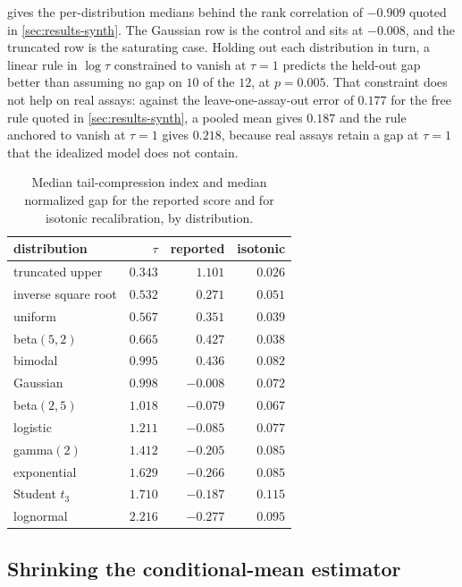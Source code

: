 \documentclass{article}
\theoremstyle{plain}
\theoremstyle{definition}
\begin{document}
 gives the per-distribution medians behind the rank correlation of
$-0.909$ quoted in \cref{sec:results-synth}. The Gaussian row is the control and sits
at $-0.008$, and the truncated row is the saturating case. Holding out each distribution
in turn, a linear rule in $\log \tau$ constrained to vanish at $\tau = 1$ predicts the
held-out gap better than assuming no gap on $10$ of the $12$, at $p = 0.005$. That
constraint does not help on real assays: against the leave-one-assay-out error of
$0.177$ for the free rule quoted in \cref{sec:results-synth}, a pooled mean gives
$0.187$ and the rule anchored to vanish at $\tau = 1$ gives $0.218$, because real
assays retain a gap at $\tau = 1$ that the idealized model does not contain.

\begin{table}[ht]
\caption{Median tail-compression index and median normalized gap for the reported
score and for isotonic recalibration, by distribution.}
\label{tab:shapes}
\vskip 0.1in
\begin{center}
\begin{small}
\begin{tabular}{lrrr}
\toprule
distribution & $\tau$ & reported & isotonic \\
\midrule
truncated upper & $0.343$ & $1.101$ & $0.026$ \\
inverse square root & $0.532$ & $0.271$ & $0.051$ \\
uniform & $0.567$ & $0.351$ & $0.039$ \\
beta$(5,2)$ & $0.665$ & $0.427$ & $0.038$ \\
bimodal & $0.995$ & $0.436$ & $0.082$ \\
Gaussian & $0.998$ & $-0.008$ & $0.072$ \\
beta$(2,5)$ & $1.018$ & $-0.079$ & $0.067$ \\
logistic & $1.211$ & $-0.085$ & $0.077$ \\
gamma$(2)$ & $1.412$ & $-0.205$ & $0.085$ \\
exponential & $1.629$ & $-0.266$ & $0.085$ \\
Student $t_3$ & $1.710$ & $-0.187$ & $0.115$ \\
lognormal & $2.216$ & $-0.277$ & $0.095$ \\
\bottomrule
\end{tabular}
\end{small}
\end{center}
\vskip -0.1in
\end{table}

\subsection{Shrinking the conditional-mean estimator}
\label{app:shrink}
\end{document}
